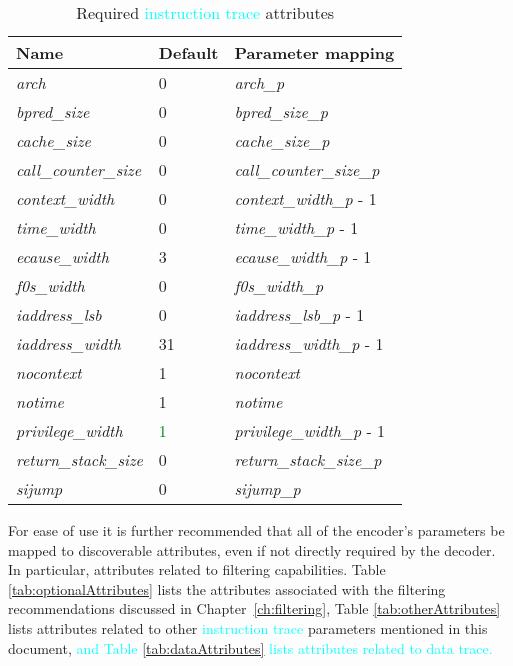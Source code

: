 \begin{table}[!h]
    \centering
    \caption{Required \textcolor{cyan}{instruction trace} attributes}
    \label{tab:requiredAttributes}
    \begin{tabulary}{\textwidth}{|l|l|p{80mm}|}
        \hline
        \textbf{Name} & \textbf{Default} & \textbf{Parameter mapping} \\
        \hline
        \textit{arch} & 0 & \textit{arch\_p} \\
        \hline
        \textit{bpred\_size} & 0 & \textit{bpred\_size\_p}  \\
        \hline
        \textit{cache\_size} & 0 & \textit{cache\_size\_p} \\
        \hline
        \textit{call\_counter\_size} & 0 & \textit{call\_counter\_size\_p} \\
        \hline
        \textit{context\_width} & 0 & \textit{context\_width\_p} - 1 \\
        \hline
        \textit{time\_width} & 0 & \textit{time\_width\_p} - 1 \\
        \hline
        \textit{ecause\_width} & 3 & \textit{ecause\_width\_p} - 1 \\
        \hline
        \textit{f0s\_width} & 0 & \textit{f0s\_width\_p} \\
        \hline
        \textit{iaddress\_lsb} & 0 & \textit{iaddress\_lsb\_p} - 1 \\
        \hline
        \textit{iaddress\_width} & 31 & \textit{iaddress\_width\_p} - 1 \\
        \hline
        \textit{nocontext} & 1 & \textit{nocontext} \\
        \hline
        \textit{notime} & 1 & \textit{notime} \\
        \hline
        \textit{privilege\_width} & \textcolor{green}{1} & \textit{privilege\_width\_p} - 1 \\
        \hline
        \textit{return\_stack\_size} & 0 & \textit{return\_stack\_size\_p} \\
        \hline
        \textit{sijump} & 0 & \textit{sijump\_p} \\
        \hline
    \end{tabulary}
\end{table}

For ease of use it is further recommended that all of the encoder's parameters be mapped to 
discoverable attributes, even if not directly required by the decoder.  In particular, 
attributes related to filtering capabilities.  Table \ref{tab:optionalAttributes} lists the attributes
associated with the filtering recommendations discussed in Chapter~\ref{ch:filtering},  
Table \ref{tab:otherAttributes} lists attributes related to other \textcolor{cyan}{instruction trace}
parameters mentioned in this document, \textcolor{cyan}{and Table \ref{tab:dataAttributes} lists 
attributes related to data trace.}

